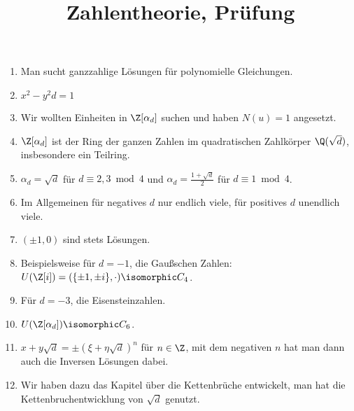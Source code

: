 \documentclass{scrartcl}
\title{Zahlentheorie, Prüfung}
\author{}
\date{}
\begin{document}
\maketitle

\begin{enumerate}
	\item
		Man sucht ganzzahlige Lösungen für polynomielle Gleichungen.
	\item
		$x^2 - y^2 d = 1$
	\item
		Wir wollten Einheiten in $\Z[\alpha_d]$ suchen und haben $N(u) = 1$ angesetzt.
	\item
		$\Z[\alpha_d]$ ist der Ring der ganzen Zahlen im quadratischen Zahlkörper $\Q(\sqrt d)$, insbesondere ein Teilring.
	\item
		$\alpha_d = \sqrt d$ für $d \equiv 2,3 \bmod 4$ und $\alpha_d = \frac {1+\sqrt d}{2}$ für $d \equiv 1 \bmod 4$.
	\item
		Im Allgemeinen für negatives $d$ nur endlich viele, für positives $d$ unendlich viele.
	\item
		$(\pm 1, 0)$ sind stets Lösungen.
	\item
		Beispielsweise für $d = -1$, die Gaußschen Zahlen: $U(\Z[i]) = (\{\pm 1, \pm i\}, \cdot) \isomorphic C_4$.
	\item
		Für $d = -3$, die Eisensteinzahlen.
	\item
		$U(\Z[\alpha_d]) \isomorphic C_6$.
	\item
		$x + y\sqrt d = \pm (\xi + \eta \sqrt d)^n$ für $n \in \Z$, mit dem negativen $n$ hat man dann auch die Inversen Lösungen dabei.
	\item
		Wir haben dazu das Kapitel über die Kettenbrüche entwickelt, man hat die Kettenbruchentwicklung von $\sqrt d$ genutzt.

\end{enumerate}
\end{document}
